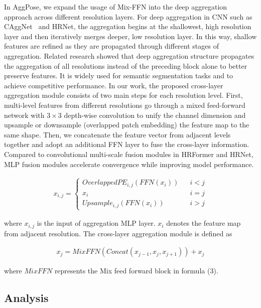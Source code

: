 \documentclass{article}
\begin{document}
In AggPose, we expand the usage of Mix-FFN into the deep aggregation approach across different resolution layers. For deep aggregation in CNN such as CAggNet~\cite{cao2021caggnet} and HRNet, the aggregation begins at the shallowest, high resolution layer and then iteratively merges deeper, low resolution layer. In this way, shallow features are refined as they are propagated through different stages of aggregation. Related research showed that deep aggregation structure propagates the aggregation of all resolutions instead of the preceding block alone to better preserve features. It is widely used for semantic segmentation tasks and to achieve competitive performance. In our work, the proposed cross-layer aggregation module consists of two main steps for each resolution level. First, multi-level features from different resolutions go through a mixed feed-forward network with $3 \times 3$ depth-wise convolution to unify the channel dimension and upsample or downsample (overlapped patch embedding) the feature map to the same shape. Then, we concatenate the feature vector from adjacent levels together and adopt an additional FFN layer to fuse the cross-layer information. Compared to convolutional multi-scale fusion modules in HRFormer and HRNet, MLP fusion modules accelerate convergence while improving model performance.

\begin{align}
x_{i,j}=\left\{
\begin{array}{rcl}
OverlappedPE_{i,j}(FFN(x_{i}))  &      & i < j  \\
x_{i}   &      & i=j   \\ 
Upsample_{i,j}(FFN(x_{i}))  &      & i > j
\end{array} \right.
\end{align}

where $x_{i,j}$ is the input of aggregation MLP layer. $x_{i}$ denotes the feature map from adjacent resolution. The cross-layer aggregation module is defined as

\begin{align}
    x_{j}= MixFFN(Concat(x_{j-1}, x_{j}, x_{j+1})) + x_{j}
\end{align}

where $MixFFN$ represents the Mix feed forward block in formula (3).


\subsection{Analysis}
\end{document}
